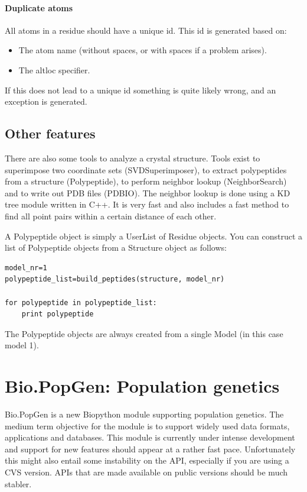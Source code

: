\documentclass{report}
\begin{document}
\paragraph{Duplicate atoms}

All atoms in a residue should have a unique id. This id is generated based on:

\begin{itemize}
\item The atom name (without spaces, or with spaces if a problem arises).
\item The altloc specifier.
\end{itemize}
If this does not lead to a unique id something is quite likely wrong, and an
exception is generated.

\subsection{Other features}

There are also some tools to analyze a crystal structure. Tools
exist to superimpose two coordinate sets (SVDSuperimposer), to extract 
polypeptides from a structure (Polypeptide), to perform neighbor lookup
(NeighborSearch) and to write out PDB files (PDBIO). The neighbor lookup
is done using a KD tree module written in C++. It is very fast and also
includes a fast method to find all point pairs within a certain distance 
of each other.

A Polypeptide object is simply a UserList of Residue objects. You can 
construct a list of Polypeptide objects from a Structure object as follows:

\begin{verbatim}
model_nr=1
polypeptide_list=build_peptides(structure, model_nr)

for polypeptide in polypeptide_list:
    print polypeptide
\end{verbatim}

The Polypeptide objects are always created from a single 
Model (in this case model 1).


\section{Bio.PopGen: Population genetics}

Bio.PopGen is a new Biopython module supporting population genetics.
The medium term objective for the module is to support widely used data
formats, applications and databases. This module is currently under intense
development and support for new features should appear at a rather fast pace.
Unfortunately this might also entail some instability on the API, especially
if you are using a CVS version. APIs that are made available on public
versions should be much stabler.
\end{document}
